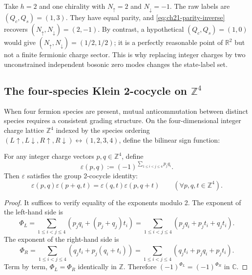 \begin{example}
Take $h=2$ and one chirality with
$N_\uparrow=2$ and $N_\downarrow=-1$.  The raw labels are
$(Q_c,Q_s)=(1,3)$.  They have equal parity, and
\eqref{eq:ch21-parity-inverse} recovers
$(N_\uparrow,N_\downarrow)=(2,-1)$.  By contrast, a hypothetical
$(Q_c,Q_s)=(1,0)$ would give
$(N_\uparrow,N_\downarrow)=(1/2,1/2)$; it is a perfectly reasonable
point of $\mathbb R^2$ but not a finite fermionic charge sector.
This is why replacing integer charges by two unconstrained
independent bosonic zero modes changes the state-label set.
\end{example}

\subsection*{The four-species Klein 2-cocycle on $\mathbb Z^4$}
\label{subsec:ch21-four-species-cocycle}

When four fermion species are present, mutual anticommutation between distinct species
requires a consistent grading structure.  On the four-dimensional integer charge lattice
$\mathbb Z^4$ indexed by the species ordering $(L\uparrow, L\downarrow, R\uparrow, R\downarrow) \leftrightarrow (1, 2, 3, 4)$,
define the bilinear sign function:

\begin{theorem}
\label{thm:ch21-cocycle-identity}
For any integer charge vectors $p, q \in \mathbb Z^4$, define
\begin{equation}
 \varepsilon(p, q) := (-1)^{\sum_{1 \le i < j \le 4} p_j q_i}.
 \label{eq:ch21-cocycle-def}
\end{equation}
Then $\varepsilon$ satisfies the group 2-cocycle identity:
\begin{equation}
 \varepsilon(p, q) \varepsilon(p+q, t) = \varepsilon(q, t) \varepsilon(p, q+t)
 \qquad (\forall p, q, t \in \mathbb Z^4).
 \label{eq:ch21-cocycle-law}
\end{equation}
\end{theorem}
\begin{proof}
It suffices to verify equality of the exponents modulo 2.
The exponent of the left-hand side is
\[
 \Phi_L = \sum_{1 \le i < j \le 4} \left( p_j q_i + (p_j + q_j) t_i \right)
        = \sum_{1 \le i < j \le 4} \left( p_j q_i + p_j t_i + q_j t_i \right).
\]
The exponent of the right-hand side is
\[
 \Phi_R = \sum_{1 \le i < j \le 4} \left( q_j t_i + p_j (q_i + t_i) \right)
        = \sum_{1 \le i < j \le 4} \left( q_j t_i + p_j q_i + p_j t_i \right).
\]
Term by term, $\Phi_L = \Phi_R$ identically in $\mathbb Z$.
Therefore $(-1)^{\Phi_L} = (-1)^{\Phi_R}$ in $\mathbb C$.
\end{proof}

